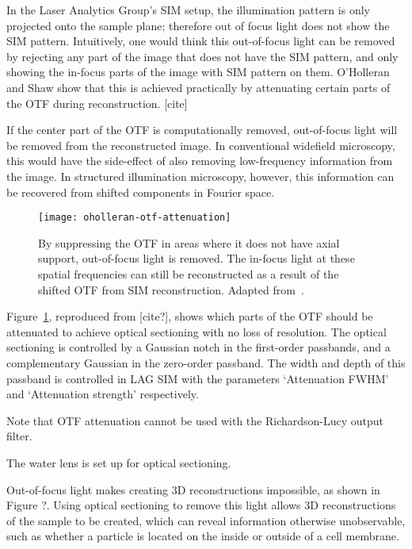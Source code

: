 In the Laser Analytics Group's SIM setup, the illumination pattern is only projected onto the sample plane; therefore out of focus light does not show the SIM pattern.
Intuitively, one would think this out-of-focus light can be removed by rejecting any part of the image that does not have the SIM pattern, and only showing the in-focus parts of the image with SIM pattern on them. 
O'Holleran and Shaw show that this is achieved practically by attenuating certain parts of the OTF during reconstruction. [cite]

If the center part of the OTF is computationally removed, out-of-focus light will be removed from the reconstructed image.
In conventional widefield microscopy, this would have the side-effect of also removing low-frequency information from the image. 
In structured illumination microscopy, however, this information can be recovered from shifted components in Fourier space. 

\begin{figure}[htbp!]
\centering
\texttt{[image: oholleran-otf-attenuation]}
\caption[LAG SIM: OTF attenuation]{By suppressing the OTF in areas where it does not have axial support, out-of-focus light is removed. The in-focus light at these spatial frequencies can still be reconstructed as a result of the shifted OTF from SIM reconstruction. Adapted from~\cite{oholleran2014optimized}. }
\label{fig:oholleran-otf}
\end{figure}

Figure~\ref{fig:oholleran-otf}, reproduced from [cite?], shows which parts of the OTF should be attenuated to achieve optical sectioning with no loss of resolution. 
The optical sectioning is controlled by a Gaussian notch in the first-order passbands, and a complementary Gaussian in the zero-order passband. 
The width and depth of this passband is controlled in LAG SIM with the parameters `Attenuation FWHM' and `Attenuation strength' respectively.


Note that OTF attenuation cannot be used with the Richardson-Lucy output filter. 

The water lens is set up for optical sectioning. 

Out-of-focus light makes creating 3D reconstructions impossible, as shown in Figure ?. %
Using optical sectioning to remove this light allows 3D reconstructions of the sample to be created, which can reveal information otherwise unobservable, such as whether a particle is located on the inside or outside of a cell membrane. 

